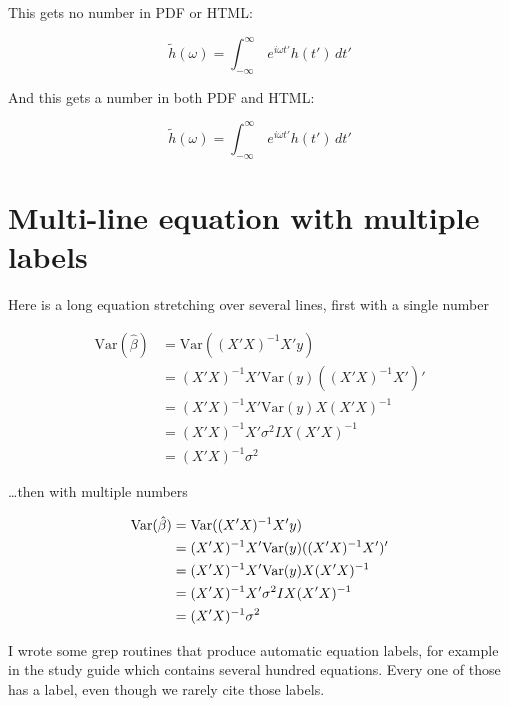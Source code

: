 \documentclass[]{book}
\begin{document}
This gets no number in PDF or HTML:

\begin{equation*} 
  \tilde h(\omega) = \int_{-\infty}^{\infty}\,e^{i\omega t'} h(t') \, dt'
\end{equation*}

And this gets a number in both PDF and HTML:

\begin{equation} 
  \tilde h(\omega) = \int_{-\infty}^{\infty}\,e^{i\omega t'} h(t') \, dt'
  \label{eq:transfu}
\end{equation}

\hypertarget{multi-line-equation-with-multiple-labels}{%
\section{Multi-line equation with multiple labels}\label{multi-line-equation-with-multiple-labels}}

Here is a long equation stretching over several lines, first with a single number

\begin{equation} 
\begin{split}
\mathrm{Var}(\hat{\beta}) & =\mathrm{Var}((X'X)^{-1}X'y)\\
 & =(X'X)^{-1}X'\mathrm{Var}(y)((X'X)^{-1}X')'\\
 & =(X'X)^{-1}X'\mathrm{Var}(y)X(X'X)^{-1}\\
 & =(X'X)^{-1}X'\sigma^{2}IX(X'X)^{-1}\\
 & =(X'X)^{-1}\sigma^{2}
\end{split}
\label{eq:var-beta1}
\end{equation}

\ldots{}then with multiple numbers

\begin{align}
\mathrm{Var}(\hat{\beta}) & =\mathrm{Var}((X'X)^{-1}X'y) \notag \\
 & =(X'X)^{-1}X'\mathrm{Var}(y)((X'X)^{-1}X')'\label{eq:var-a}\\ 
 & =(X'X)^{-1}X'\mathrm{Var}(y)X(X'X)^{-1}\label{eq:var-b}\\ 
 & =(X'X)^{-1}X'\sigma^{2}IX(X'X)^{-1}\label{eq:var-c}\\ 
 & =(X'X)^{-1}\sigma^{2} \label{eq:var-d}
\end{align}

I wrote some grep routines that produce automatic equation labels, for example in the study guide which contains several hundred equations. Every one of those has a label, even though we rarely cite those labels.
\end{document}
